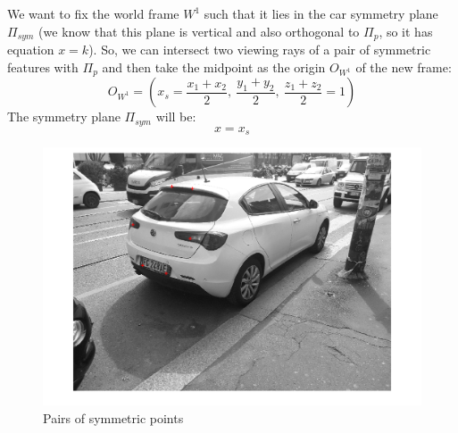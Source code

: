 \documentclass{article}
\begin{document}
We want to fix the world frame $W^1$ such that it lies in the car symmetry plane $\Pi_{sym}$ (we know that this plane is vertical and also orthogonal to $\Pi_p$, so it has equation $x=k$). So, we can intersect two viewing rays of a pair of symmetric features with $\Pi_{p}$ and then take the midpoint as the origin $O_{W^1}$ of the new frame:
$$ O_{W^1} = ( x_s = \frac{x_1+x_2}{2}, \: \frac{y_1+y_2}{2}, \: \frac{z_1+z_2}{2}=1 ) $$
The symmetry plane $\Pi_{sym}$ will be:
$$ x=x_s $$

\begin{figure}[h!]
\centering
\includegraphics[scale=0.35]{images/homework_14.png}
\caption{Pairs of symmetric points}
\label{fig:symmetricfeatures}
\end{figure}
\end{document}
